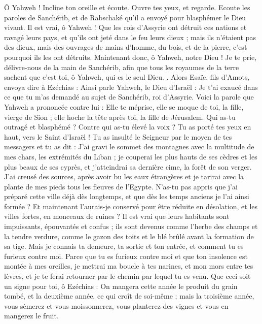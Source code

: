 \begin{multicols}{2}
Ô Yahweh ! Incline ton oreille et écoute. Ouvre tes yeux, et regarde. Ecoute les paroles de Sanchérib, et de Rabschaké qu'il a envoyé pour blasphémer le Dieu vivant.
Il est vrai, ô Yahweh ! Que les rois d'Assyrie ont détruit ces nations et ravagé leurs pays,
et qu'ils ont jeté dans le feu leurs dieux ; mais ils n'étaient pas des dieux, mais des ouvrages de mains d'homme, du bois, et de la pierre, c'est pourquoi ils les ont détruits.
Maintenant donc, ô Yahweh, notre Dieu ! Je te prie, délivre-nous de la main de Sanchérib, afin que tous les royaumes de la terre sachent que c'est toi, ô Yahweh, qui es le seul Dieu.
.
Alors Esaïe, fils d'Amots, envoya dire à Ezéchias : Ainsi parle Yahweh, le Dieu d'Israël : Je t'ai exaucé dans ce que tu m'as demandé au sujet de Sanchérib, roi d'Assyrie.
Voici la parole que Yahweh a prononcée contre lui : Elle te méprise, elle se moque de toi, la fille, vierge de Sion ; elle hoche la tête après toi, la fille de Jérusalem.
Qui as-tu outragé et blasphémé ? Contre qui as-tu élevé la voix ? Tu as porté tes yeux en haut, vers le Saint d'Israël !
Tu as insulté le Seigneur par le moyen de tes messagers et tu as dit : J'ai gravi le sommet des montagnes avec la multitude de mes chars, les extrémités du Liban ; je couperai les plus hauts de ses cèdres et les plus beaux de ses cyprès, et j'atteindrai sa dernière cime, la forêt de son verger.
J'ai creusé des sources, après avoir bu les eaux étrangères et je tarirai avec la plante de mes pieds tous les fleuves de l'Egypte.
N'as-tu pas appris que j'ai préparé cette ville déjà dès longtemps, et que dès les temps anciens je l'ai ainsi formée ? Et maintenant l'aurais-je conservé pour être réduite en désolation, et les villes fortes, en monceaux de ruines ?
Il est vrai que leurs habitants sont impuissants, épouvantés et confus ; ils sont devenus comme l'herbe des champs et la tendre verdure, comme le gazon des toits et le blé brûlé avant la formation de sa tige.
Mais je connais ta demeure, ta sortie et ton entrée, et comment tu es furieux contre moi.
Parce que tu es furieux contre moi et que ton insolence est montée à mes oreilles, je mettrai ma boucle à tes narines, et mon mors entre tes lèvres, et je te ferai retourner par le chemin par lequel tu es venu.
Que ceci soit un signe pour toi, ô Ezéchias : On mangera cette année le produit du grain tombé, et la deuxième année, ce qui croît de soi-même ; mais la troisième année, vous sèmerez et vous moissonnerez, vous planterez des vignes et vous en mangerez le fruit.

\end{multicols}

